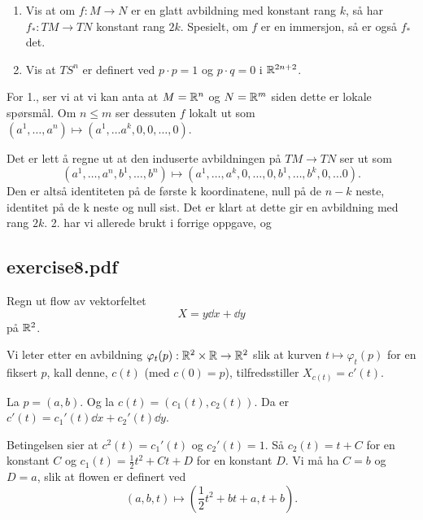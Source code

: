 \documentclass[11pt, english]{article}
\begin{document}
\begin{exc}
\begin{enumerate}
\item Vis at om $f:M \to N$ er en glatt avbildning med konstant rang $k$, så har $f_\ast: TM \to TN$ konstant rang $2k$. Spesielt, om $f$ er en immersjon, så er også $f_\ast$ det.
\item Vis at $TS^n$ er definert ved $ p \cdot p = 1$ og $p \cdot q = 0$ i $\mathbb{R}^{2n+2}$.
\end{enumerate}
\end{exc}
\begin{sol}
For 1., ser vi at vi kan anta at $M= \mathbb{R}^n$ og $N= \mathbb{R}^m$ siden dette er lokale spørsmål. Om $n \leq m$ ser dessuten $f$ lokalt ut som $(a^1,\ldots,a^n) \mapsto (a^1,\ldots a^k, 0,0, \ldots,0)$. 

Det er lett å regne ut at den induserte avbildningen på $TM \to TN$ ser ut som 
$$
(a^1, \ldots, a^n, b^1, \ldots, b^n) \mapsto (a^1, \ldots, a^k, 0,\ldots,0,b^1, \ldots, b^k, 0,\ldots 0).
$$
Den er altså identiteten på de første k koordinatene, null på de $n-k$ neste, identitet på de k neste og null sist. Det er klart at dette gir en avbildning med rang $2k$.
2. har vi allerede brukt i forrige oppgave, og 
\end{sol}

\subsection{exercise8.pdf}

\begin{exc}
Regn ut flow av vektorfeltet 
$$
X = y \dd{}{x} + \dd{}{y} 
$$
på $\mathbb{R}^2$.
\end{exc}
\begin{sol}
Vi leter etter en avbildning $\varphi_t(p):\mathbb{R}^2 \times \mathbb{R} \to \mathbb{R}^2$ slik at kurven $t \mapsto \varphi_t(p)$ for en fiksert $p$, kall denne, $c(t)$ (med $c(0)=p$), tilfredsstiller $X_{c(t)} = c'(t)$. 

La $p=(a,b)$. Og la $c(t) = (c_1(t),c_2(t))$. Da er $c'(t) = c_1'(t) \dd{}{x} + c_2'(t) \dd{}{y}$.

Betingelsen sier at $c^2(t)=c_1'(t)$ og $c_2'(t) = 1$. Så $c_2(t)=t+C$ for en konstant $C$ og $c_1(t) = \frac 12 t^2+Ct+D$ for en konstant $D$. Vi må ha $C=b$ og $D=a$, slik at flowen er definert ved 
$$
(a,b,t) \mapsto (\frac 12 t^2+bt+a, t+b).
$$
\end{sol}
\end{document}
